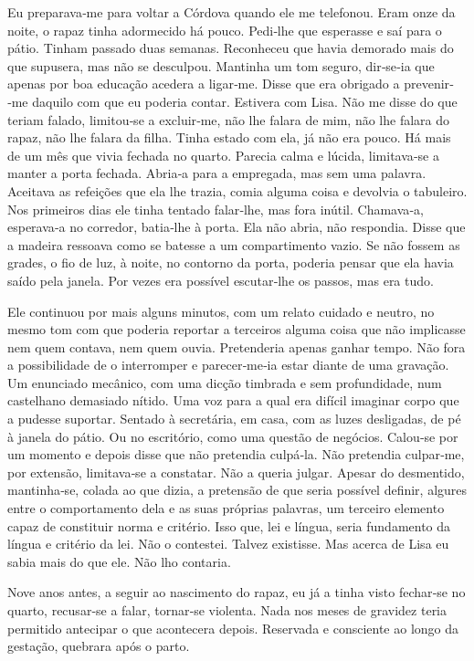 Eu preparava­‑me para voltar a Córdova quando ele me telefonou. Eram
onze da noite, o rapaz tinha adormecido há pouco. Pedi­‑lhe que
esperasse e saí para o pátio. Tinham passado duas semanas. Reconheceu
que havia demorado mais do que supusera, mas não se desculpou. Mantinha
um tom seguro, dir­‑se­‑ia que apenas por boa educação acedera a
ligar­‑me. Disse que era obrigado a prevenir­‑me daquilo com que eu
poderia contar. Estivera com Lisa. Não me disse do que teriam falado,
limitou­‑se a excluir­‑me, não lhe falara de mim, não lhe falara do
rapaz, não lhe falara da filha. Tinha estado com ela, já não era pouco.
Há mais de um mês que vivia fechada no quarto. Parecia calma e lúcida,
limitava­‑se a manter a porta fechada. Abria­‑a para a empregada, mas
sem uma palavra. Aceitava as refeições que ela lhe trazia, comia alguma
coisa e devolvia o tabuleiro. Nos primeiros dias ele tinha tentado
falar­‑lhe, mas fora inútil. Chamava­‑a, esperava­‑a no corredor,
batia­‑lhe à porta. Ela não abria, não respondia. Disse que a madeira
ressoava como se batesse a um compartimento vazio. Se não fossem as
grades, o fio de luz, à noite, no contorno da porta, poderia pensar que
ela havia saído pela janela. Por vezes era possível escutar­‑lhe os
passos, mas era tudo.

Ele continuou por mais alguns minutos, com um relato cuidado e neutro,
no mesmo tom com que poderia reportar a terceiros alguma coisa que não
implicasse nem quem contava, nem quem ouvia. Pretenderia apenas ganhar
tempo. Não fora a possibilidade de o interromper e parecer­‑me­‑ia estar
diante de uma gravação. Um enunciado mecânico, com uma dicção timbrada e
sem profundidade, num castelhano demasiado nítido. Uma voz para a qual
era difícil imaginar corpo que a pudesse suportar. Sentado à secretária,
em casa, com as luzes desligadas, de pé à janela do pátio. Ou no
escritório, como uma questão de negócios. Calou­‑se por um momento e
depois disse que não pretendia culpá­‑la. Não pretendia culpar­‑me, por
extensão, limitava­‑se a constatar. Não a queria julgar. Apesar do
desmentido, mantinha­‑se, colada ao que dizia, a pretensão de que seria
possível definir, algures entre o comportamento dela e as suas próprias
palavras, um terceiro elemento capaz de constituir norma e critério.
Isso que, lei e língua, seria fundamento da língua e critério da lei.
Não o contestei. Talvez existisse. Mas acerca de Lisa eu sabia mais do
que ele. Não lho contaria.

Nove anos antes, a seguir ao nascimento do rapaz, eu já a tinha visto
fechar­‑se no quarto, recusar­‑se a falar, tornar­‑se violenta. Nada nos
meses de gravidez teria permitido antecipar o que acontecera depois.
Reservada e consciente ao longo da gestação, quebrara após o parto.

